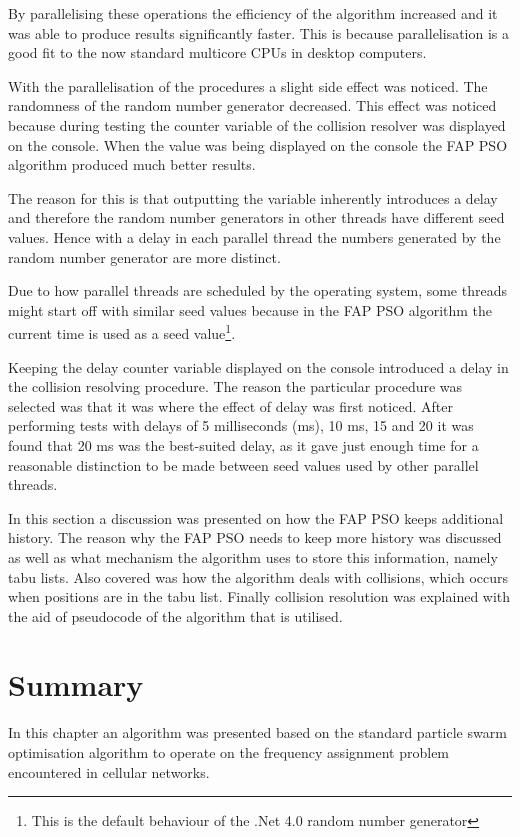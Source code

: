 By parallelising these operations the efficiency of the algorithm increased and it was able to produce results significantly faster. This is because parallelisation is a good fit to the now standard multicore CPUs in desktop computers.

With the parallelisation of the procedures a slight side effect was noticed. The randomness of the random number generator decreased. This effect was noticed because during testing the counter variable of the collision resolver was displayed on the console. When the value was being displayed on the console the FAP PSO algorithm produced much better results. 

The reason for this is that outputting the variable inherently introduces a delay and therefore the random number generators in other threads have different seed values. Hence with a delay in each parallel thread the numbers generated by the random number generator are more distinct. 

Due to how parallel threads are scheduled by the operating system, some threads might start off with similar seed values because in  the FAP PSO algorithm the current time is used as a seed value\footnote{This is the default behaviour of the .Net 4.0 random number generator}.

Keeping the delay counter variable displayed on the console introduced a delay in the collision resolving procedure. The reason the particular procedure was selected was that it was where the effect of delay was first noticed. After performing tests with delays of 5 milliseconds (ms), 10 ms, 15 and 20 it was found that 20 ms was the best-suited delay, as it gave just enough time for a reasonable distinction to be made between seed values used by other parallel threads.

In this section a discussion was presented on how the FAP PSO keeps additional history. The reason why the FAP PSO needs to keep more history was discussed as well as what mechanism the algorithm uses to store this information, namely tabu lists. Also covered was how the algorithm deals with collisions, which occurs when positions are in the tabu list. Finally collision resolution was explained with the aid of pseudocode of the algorithm that is utilised.

\section{Summary}
In this chapter an algorithm was presented based on the standard particle swarm optimisation algorithm to operate on the frequency assignment problem encountered in cellular networks.

